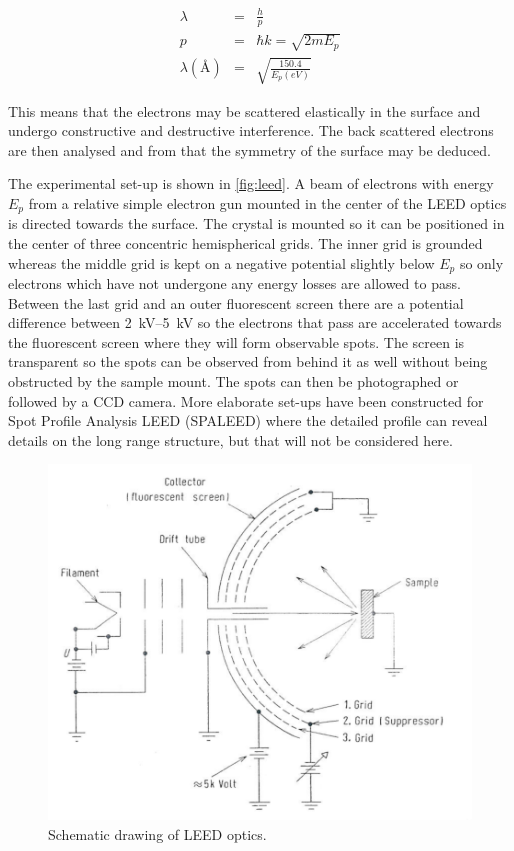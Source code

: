 \begin{eqnarray}
\lambda	& =	& \frac{h}{p}\\
p	& =	& \hbar k=\sqrt{2mE_p}\\
\lambda(\si{\angstrom})	& =	& \sqrt{\frac{150.4}{E_p(\si{eV})}}
\end{eqnarray}

This means that the electrons may be scattered elastically  in the surface and undergo constructive and destructive interference. The back scattered electrons are then analysed and from that the symmetry of the surface may be deduced.

The experimental set-up is shown in \autoref{fig:leed}.  A beam of electrons with energy $E_p$ from a relative simple electron gun mounted in the center of the LEED optics is directed towards the surface. The crystal is mounted so it can be positioned in the center of three concentric hemispherical grids. The inner grid is grounded whereas the middle grid is kept on a negative potential slightly below $E_p$ so only electrons which have not undergone any energy losses are allowed to pass. Between the last grid and an outer fluorescent screen there are a potential difference between \SIrange{2}{5}{kV} so the electrons that pass are accelerated towards the fluorescent screen where they will form observable spots. The screen is  transparent so the spots can be observed from behind it as well without being obstructed by the sample mount. The spots can then be photographed or followed by a CCD camera. More elaborate set-ups have been constructed for Spot Profile Analysis LEED (SPALEED) where the detailed profile can reveal details on the long range structure, but that will not be considered here.

\begin{figure}[h!]
	\begin{center}
	\includegraphics[scale=4]{figures/09_05.png}
	\caption{Schematic drawing of LEED optics.}
	\label{fig:leed}
	\end{center}
\end{figure}

